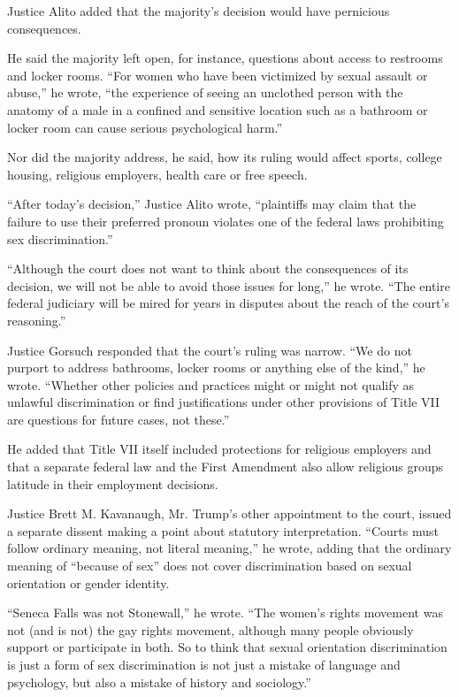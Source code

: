 Justice Alito added that the majority's decision would have pernicious
consequences.

He said the majority left open, for instance, questions about access to
restrooms and locker rooms. ``For women who have been victimized by
sexual assault or abuse,'' he wrote, ``the experience of seeing an
unclothed person with the anatomy of a male in a confined and sensitive
location such as a bathroom or locker room can cause serious
psychological harm.''

Nor did the majority address, he said, how its ruling would affect
sports, college housing, religious employers, health care or free
speech.

``After today's decision,'' Justice Alito wrote, ``plaintiffs may claim
that the failure to use their preferred pronoun violates one of the
federal laws prohibiting sex discrimination.''

``Although the court does not want to think about the consequences of
its decision, we will not be able to avoid those issues for long,'' he
wrote. ``The entire federal judiciary will be mired for years in
disputes about the reach of the court's reasoning.''

Justice Gorsuch responded that the court's ruling was narrow. ``We do
not purport to address bathrooms, locker rooms or anything else of the
kind,'' he wrote. ``Whether other policies and practices might or might
not qualify as unlawful discrimination or find justifications under
other provisions of Title VII are questions for future cases, not
these.''

He added that Title VII itself included protections for religious
employers and that a separate federal law and the First Amendment also
allow religious groups latitude in their employment decisions.

Justice Brett M. Kavanaugh, Mr. Trump's other appointment to the court,
issued a separate dissent making a point about statutory interpretation.
``Courts must follow ordinary meaning, not literal meaning,'' he wrote,
adding that the ordinary meaning of ``because of sex'' does not cover
discrimination based on sexual orientation or gender identity.

``Seneca Falls was not Stonewall,'' he wrote. ``The women's rights
movement was not (and is not) the gay rights movement, although many
people obviously support or participate in both. So to think that sexual
orientation discrimination is just a form of sex discrimination is not
just a mistake of language and psychology, but also a mistake of history
and sociology.''


